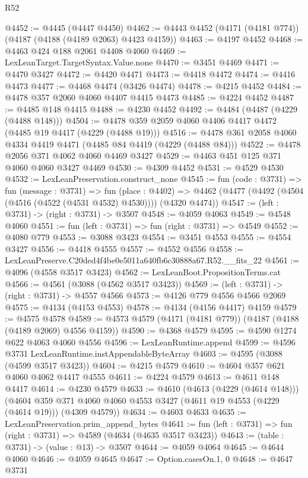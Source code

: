 \begin{lexlean}{R52}
\begin{coremodule}
@4452 := @4445 (@4447 @4450)
@4462 := @4443 @4452 (@4171 (@4181 @774)) (@4187 (@4188 (@4189 @2063) @4423 @4159))
@4463 := @4197 @4452
@4468 := @4463 @424 @188 @2061 @4408 @4060
@4469 := LexLeanTarget.TargetSyntax.Value.none
@4470 := @3451 @4469
@4471 := @4470 @3427
@4472 := @4420 @4471
@4473 := @4418 @4472
@4474 := @4416 @4473
@4477 := @4468 @4474 (@3426 @4474)
@4478 := @4215 @4452
@4484 := @4478 @357 @2060 @4060 @4407 @4415 @4473
@4485 := @4224 @4452
@4487 := @4485 @148 @4415
@4488 := @4230 @4452
@4492 := @4484 (@4487 (@4229 (@4488 @148)))
@4504 := @4478 @359 @2059 @4060 @4406 @4417 @4472 (@4485 @19 @4417 (@4229 (@4488 @19)))
@4516 := @4478 @361 @2058 @4060 @4334 @4419 @4471 (@4485 @84 @4419 (@4229 (@4488 @84)))
@4522 := @4478 @2056 @371 @4062 @4060 @4469 @3427
@4529 := @4463 @451 @125 @371 @4060 @4060 @3427 @4469
@4530 := @4309 @4452
@4531 := @4529 @4530
@4532 := LexLeanPreservation.construct_none
@4545 := fun (code : @3731) =>
  fun (message : @3731) =>
  fun (place : @4402) =>
  @4462 (@4477 (@4492 (@4504 (@4516 (@4522 (@4531 @4532) @4530)))) (@4320 @4474))
@4547 := (left : @3731) -> (right : @3731) -> @3507
@4548 := @4059 @4063
@4549 := @4548 @4060
@4551 := fun (left : @3731) => fun (right : @3731) => @4549
@4552 := @4080 @779
@4553 := @3088 @3423
@4554 := @3451 @4553
@4555 := @4554 @3427
@4556 := @4418 @4555
@4557 := @4552 @4556
@4558 := LexLeanPreserve.C20ded4f4be0e5011a640fb6c30888a67.R52.__fits_22
@4561 := @4096 (@4558 @3517 @3423)
@4562 := LexLeanBoot.PropositionTerms.cat
@4566 := @4561 (@3088 (@4562 @3517 @3423))
@4569 := (left : @3731) -> (right : @3731) -> @4557 @4566
@4573 := @4126 @779 @4556 @4566 @2069
@4575 := @4134 (@4153 @4553)
@4578 := @4134 (@4156 @4417) @4159
@4579 := @4575 @4578
@4589 := @4573 @4579 (@4171 (@4181 @779)) (@4187 (@4188 (@4189 @2069) @4556 @4159))
@4590 := @4368 @4579
@4595 := @4590 @1274 @622 @4063 @4060 @4556
@4596 := LexLeanRuntime.append
@4599 := @4596 @3731 LexLeanRuntime.instAppendableByteArray
@4603 := @4595 (@3088 (@4599 @3517 @3423))
@4604 := @4215 @4579
@4610 := @4604 @357 @621 @4060 @4062 @4417 @4555
@4611 := @4224 @4579
@4613 := @4611 @148 @4417
@4614 := @4230 @4579
@4633 := @4610
    (@4613 (@4229 (@4614 @148)))
    (@4604 @359 @371 @4060 @4060 @4553 @3427 (@4611 @19 @4553 (@4229 (@4614 @19))) (@4309 @4579))
@4634 := @4603 @4633
@4635 := LexLeanPreservation.prim_append_bytes
@4641 := fun (left : @3731) => fun (right : @3731) => @4589 (@4634 (@4635 @3517 @3423))
@4643 := (table : @3731) -> (value : @13) -> @3507
@4644 := @4059 @4064
@4645 := @4644 @4060
@4646 := @4059 @4645
@4647 := Option.casesOn.{1, 0}
@4648 := @4647 @3731

\end{coremodule}
\end{lexlean}
